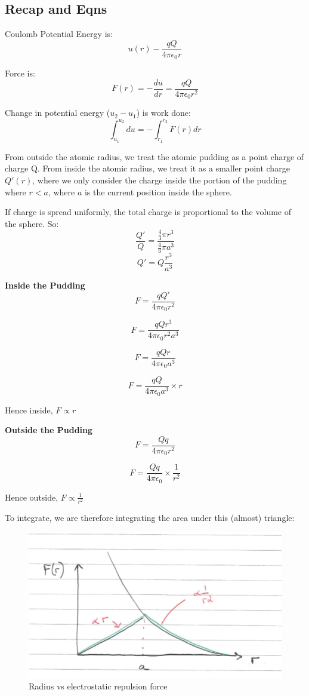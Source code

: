 \subsection*{Recap and Eqns}
 
Coulomb Potential Energy is:
\[
    u(r) - \frac{qQ}{4 \pi \epsilon_0 r}
\]

Force is:
\[
    F(r) = -\frac{du}{dr} = \frac{qQ}{4 \pi \epsilon_0 r^2}
\]

Change in potential energy ($u_2 - u_1$) is work done:
\[
    \int_{u_1}^{u_2} du = -\int_{r_1}^{r_2} F(r) dr
\]

From outside the atomic radius, we treat the atomic pudding as a point charge of charge Q.
From inside the atomic radius, we treat it as a smaller point charge $Q'(r)$, where we only consider the charge inside the portion of the pudding where $r<a$, where $a$ is the current position inside the sphere.

If charge is spread uniformly, the total charge is proportional to the volume of the sphere. So:
\[
    \frac{Q'}{Q} = \frac{\frac{4}{3} \pi r^3}{\frac{4}{3} \pi a^3}
\]
\[
    Q' = Q\frac{r^3}{a^3}
\]

\textbf{Inside the Pudding}
\[
    F = \frac{qQ'}{4 \pi \epsilon_0 r^2}
\]

\[
    F = \frac{qQr^3}{4 \pi \epsilon_0 r^2 a^3}
\]

\[
    F = \frac{qQr}{4 \pi \epsilon_0 a^3}
\]

\[
    F = \frac{qQ}{4 \pi \epsilon_0 a^3} \times r
\]


Hence inside, $F \propto r$

\textbf{Outside the Pudding}
\[
    F = \frac{Qq}{4 \pi \epsilon_0 r^2}
\]

\[
    F = \frac{Qq}{4 \pi \epsilon_0} \times \frac{1}{r^2}
\]


Hence outside, $F \propto \frac{1}{r^2}$

To integrate, we are therefore integrating the area under this (almost) triangle:
\begin{figure}[H]
    \centering
    \includegraphics{figures/lec01-03.png}
     \caption{Radius vs electrostatic repulsion force }
\end{figure}

